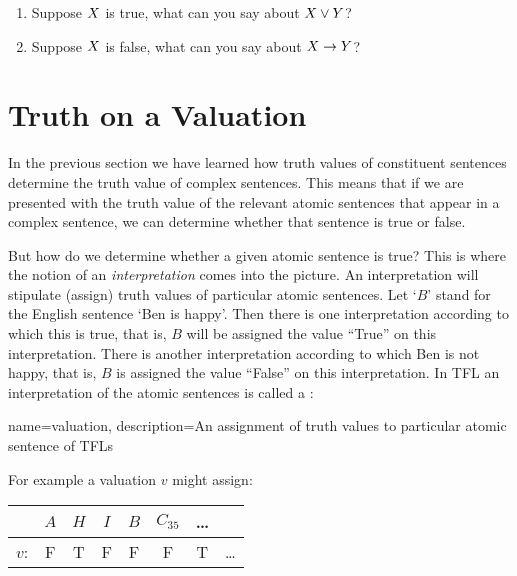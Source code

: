 \begin{practiceproblems}
	
	
	\problempart 
\begin{enumerate}
	\item Suppose $X$ is true, what can you say about $X\vee Y$?
\item Suppose $X$ is false, what can you say about $X\rightarrow Y$?
\end{enumerate}

\end{practiceproblems}



\chapter{Truth on a Valuation}
In the previous section we have learned how truth values of constituent sentences determine the truth value of complex sentences. This means that if we are presented with the truth value of the relevant atomic sentences that appear in a complex sentence, we can determine whether that sentence is true or false.

But how do we determine whether a given atomic sentence is true? This is where the notion of an \emph{interpretation} comes into the picture. An interpretation will stipulate (assign) truth values of particular atomic sentences. Let `$B$' stand for the English sentence `Ben is happy'. Then there is one interpretation according to which this is true, that is, $B$ will be assigned the value ``True'' on this interpretation. There is another interpretation according to which Ben is not happy, that is, $B$ is assigned the value ``False'' on this interpretation. In TFL an interpretation of the atomic sentences is called a :


{
name=valuation,
description={An assignment of \glspl{truth value} to particular atomic \glspl{sentence of TFL}}
}


For example a valuation $v$ might assign:
\begin{center}
	\begin{tabular}{rccccccc}
	&	$A$&$H$&$I$&$B$&$C_{35}$&\ldots\\\hline
	$v$:&	F & T &F&F&F&T&\ldots
	\end{tabular}
\end{center}

